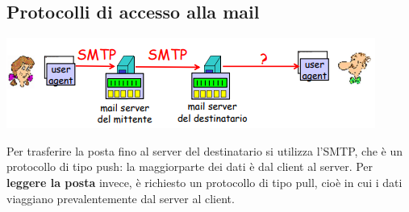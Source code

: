 \documentclass[10pt]{article}
\begin{document}
\subsection{Protocolli di accesso alla mail}
\begin{center}
\includegraphics[scale=1]{mailaccesso.png}
\end{center}
Per trasferire la posta fino al server del destinatario si utilizza l'SMTP, che è un protocollo di tipo push: la maggiorparte dei dati è dal client al server. Per \textbf{leggere la posta} invece, è richiesto un protocollo di tipo pull, cioè in cui i dati viaggiano prevalentemente dal server al client.
\end{document}
